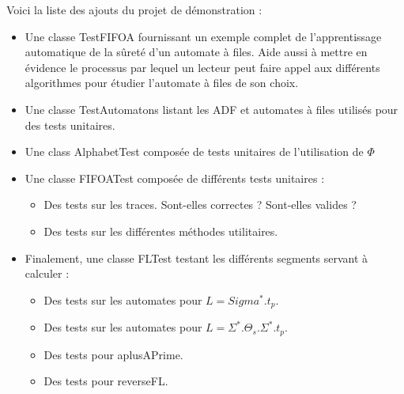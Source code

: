 Voici la liste des ajouts du projet de démonstration :
\begin{itemize}
  \item Une classe TestFIFOA fournissant un exemple complet de l'apprentissage automatique de la sûreté d'un automate à files. Aide aussi à mettre en évidence le processus par lequel un lecteur peut faire appel aux différents algorithmes pour étudier l'automate à files de son choix.
  \item Une classe TestAutomatons listant les ADF et automates à files utilisés pour des tests unitaires.
  \item Une class AlphabetTest composée de tests unitaires de l'utilisation de $\Phi$
  \item Une classe FIFOATest composée de différents tests unitaires :
    \begin{itemize}
      \item Des tests sur les traces. Sont-elles correctes ? Sont-elles valides ?
      \item Des tests sur les différentes méthodes utilitaires.
    \end{itemize}
  \item Finalement, une classe FLTest testant les différents segments servant à calculer \fl :
    \begin{itemize}
      \item Des tests sur les automates pour $L=Sigma^*.t_p$.
      \item Des tests sur les automates pour $L=\Sigma^*.\Theta_s.\Sigma^*.t_p$.
      \item Des tests pour aplusAPrime.
      \item Des tests pour reverseFL.
    \end{itemize}
\end{itemize}

